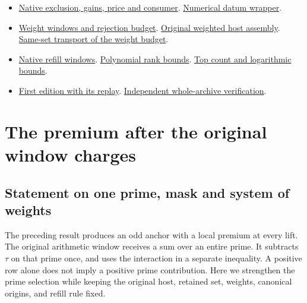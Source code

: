 \documentclass[12pt,letterpaper]{article}
\newcommand{\old}[3]{\href{https://github.com/nousentllc/riemann-hypothesis/blob/40e56bab026552e089d7afcfeff08d2defb9c005/src/#1\#L#2}{#3}}
\begin{document}
\begin{itemize}[leftmargin=*]
\item \old{Formalism/LocalToGlobal/GlobalTheory/IsResidueClassZero.lean}{149}{Native exclusion, gains, price and consumer}. \old{Formalism/LocalToGlobal/GlobalTheory/IsResidueClassZero.lean}{334}{Numerical datum wrapper}.
\item \old{Development/AbelianVarietyTheory/Definitions/GlobalTwisting/ThinScalesIffHostBound.lean}{143}{Weight windows and rejection budget}. \old{Development/AutomorphicArithmetic/CharacterBoxes/HostWW.lean}{27}{Original weighted host assembly}. \old{Development/AbelianVarietyTheory/Proofs/GlobalInterpolation/WeightWindowRequirementHostOfPoint.lean}{17}{Same-set transport of the weight budget}.
\item \old{Development/AbelianVarietyTheory/Proofs/GlobalInterpolation/ExistsRefill.lean}{124}{Native refill windows}. \old{Development/AbelianVarietyTheory/Proofs/GlobalInterpolation/ExplicitRanksBasicBoundsLargeScale.lean}{22}{Polynomial rank bounds}. \old{Development/AbelianVarietyTheory/Proofs/GlobalInterpolation/GoodTopCountLeConstMulLog.lean}{65}{Top count and logarithmic bounds}.
\item \href{https://github.com/nousentllc/riemann-hypothesis/commit/cc2e70880ad9f9cb73c962d050fab6dd9fe97542}{First edition with its replay}. \href{https://math.mit.edu/~drew/grh/}{Independent whole-archive verification}.
\end{itemize}

\section{The premium after the original window charges}
\label{sec:window-survival}

\subsection{Statement on one prime, mask and system of weights}

The preceding result produces an odd anchor with a local premium at every lift. The original arithmetic window receives a sum over an entire prime. It subtracts \(\tau\) on that prime once, and uses the interaction in a separate inequality. A positive row alone does not imply a positive prime contribution. Here we strengthen the prime selection while keeping the original host, retained set, weights, canonical origins, and refill rule fixed.
\end{document}
